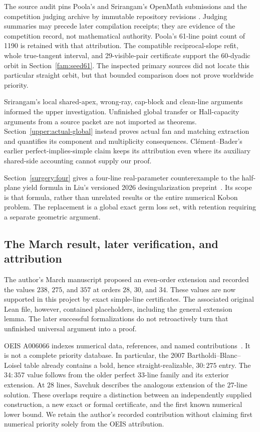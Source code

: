 The source audit pins Poola's and Srirangam's OpenMath submissions and
the competition judging archive by immutable repository revisions
\cite{poola2026,srirangam2026,openmathJudging2026}. Judging summaries
may precede later compilation receipts; they are evidence of the
competition record, not mathematical authority. Poola's 61-line point
count of 1190 is retained with that attribution. The compatible
reciprocal-slope refit, whole true-tangent interval, and 29-visible-pair
certificate support the 60-dyadic orbit in Section~\ref{fam:seed61}.
The inspected primary sources did not locate this particular straight
orbit, but that bounded comparison does not prove worldwide priority.

Srirangam's local shared-apex, wrong-ray, cap-block and clean-line
arguments informed the upper investigation. Unfinished global transfer
or Hall-capacity arguments from a source packet are not imported as
theorems. Section~\ref{upper:actual-global} instead proves actual fan
and matching extraction and quantifies its component and multiplicity
consequences. Cl\'ement--Bader's earlier perfect-implies-simple claim
keeps its attribution even where its auxiliary shared-side accounting
cannot supply our proof.

Section~\ref{surgery:four} gives a four-line real-parameter counterexample
to the half-plane yield formula in Liu's versioned 2026 desingularization
preprint~\cite{liuDesingularization2026}. Its scope is that formula,
rather than unrelated results or the entire numerical Kobon problem.
The replacement is a global exact germ loss set, with retention requiring
a separate geometric argument.

\subsection{The March result, later verification, and attribution}

The author's March manuscript proposed an even-order extension and recorded the values $238$, $275$, and $357$ at orders $28$, $30$, and $34$\citep{zarzuelo2026}. These values are now supported in this project by exact simple-line certificates. The associated original Lean file, however, contained placeholders, including the general extension lemma. The later successful formalizations do not retroactively turn that unfinished universal argument into a proof.

OEIS A006066 indexes numerical data, references, and named contributions~\citep{oeisA006066}. It is not a complete priority database. In particular, the 2007 Bartholdi--Blanc--Loisel table already contains a bold, hence straight-realizable, $30{:}275$ entry. The $34{:}357$ value follows from the older perfect $33$-line family and its exterior extension. At $28$ lines, Savchuk describes the analogous extension of the $27$-line solution. These overlaps require a distinction between an independently supplied construction, a new exact or formal certificate, and the first known numerical lower bound. We retain the author's recorded contribution without claiming first numerical priority solely from the OEIS attribution.

